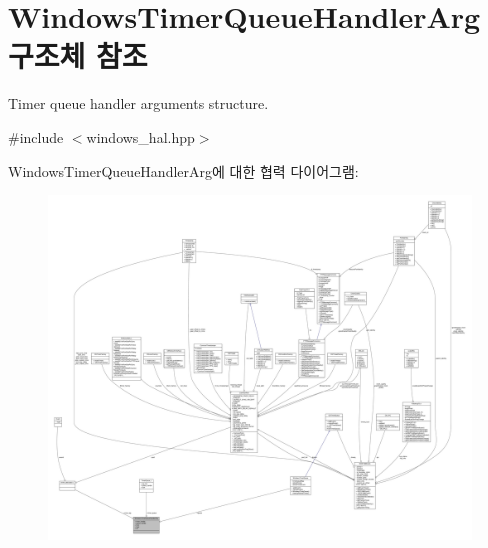 \hypertarget{struct_windows_timer_queue_handler_arg}{}\section{Windows\+Timer\+Queue\+Handler\+Arg 구조체 참조}
\label{struct_windows_timer_queue_handler_arg}


Timer queue handler arguments structure.  




{\ttfamily \#include $<$windows\+\_\+hal.\+hpp$>$}



Windows\+Timer\+Queue\+Handler\+Arg에 대한 협력 다이어그램\+:
\nopagebreak
\begin{figure}[H]
\begin{center}
\leavevmode
\includegraphics[width=350pt]{struct_windows_timer_queue_handler_arg__coll__graph}
\end{center}
\end{figure}
